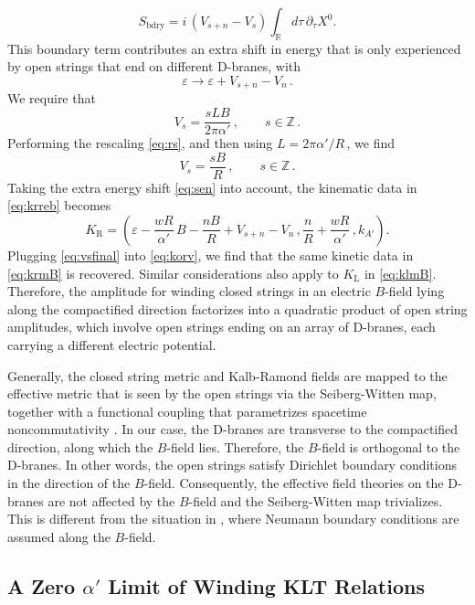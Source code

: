 \documentclass[11pt]{article}
\newcommand{\be}{\begin{equation}}
\newcommand{\ee}{\end{equation}}
\newcommand{\lr}{\left (}
\newcommand{\rr}{\right )}
\newcommand{\p}{\partial}
\begin{document}
%
\be
    S_\text{bdry} = i \, (V_{s+n} - V_s) \int_{\mathbb{R}} d\tau \, \p_\tau X^0.
\ee
%
This boundary term contributes an extra shift in energy that is only experienced by open strings that end on different D-branes, with
%
\be \label{eq:sen}
    \varepsilon \rightarrow \varepsilon + V_{s+n} - V_n\,.
\ee
%
We require that
%
\be \label{eq:Vs}
    V_s = \frac{s L B}{2\pi\alpha'}\,,
        \qquad
    s \in \mathbb{Z}\,.
\ee
%
Performing the rescaling \eqref{eq:rs}, and then using $L = 2 \pi \alpha' / R$\,, we find
%
\be \label{eq:vsfinal}
    V_s = \frac{s B}{R}\,,
        \qquad%
    s \in \mathbb{Z}\,.
\ee
%
Taking the extra energy shift \eqref{eq:sen} into account, the kinematic data in \eqref{eq:krreb} becomes
%
\be \label{eq:korv}
    K_\text{R} = \lr \varepsilon - \frac{w R}{\alpha'} \, B -  \frac{n B}{R} + V_{s+n} - V_n\,, \frac{n}{R} + \frac{w R}{\alpha'}\,, k_{A'} \rr.
\ee
%
Plugging \eqref{eq:vsfinal} into \eqref{eq:korv}, we find that the same kinetic data in \eqref{eq:krmB} is recovered. Similar considerations also apply to $K_{\text{L}}$ in \eqref{eq:klmB}. 
%
Therefore, the amplitude for winding closed strings in an electric $B$-field lying along the compactified direction factorizes into a quadratic product of open string amplitudes, which involve open strings ending on an array of D-branes, each carrying a different electric potential.

Generally, the closed string metric and Kalb-Ramond fields are mapped to the effective metric that is seen by the open strings via the Seiberg-Witten map, together with a functional coupling that parametrizes spacetime noncommutativity \cite{Seiberg:1999vs}. In our case, the D-branes are transverse to the compactified direction, along which the $B$-field lies. Therefore, the $B$-field is orthogonal to the D-branes. In other words, the open strings satisfy Dirichlet boundary conditions in the direction of the $B$-field. Consequently, the effective field theories on the D-branes are not affected by the $B$-field and the Seiberg-Witten map trivializes. This is different from the situation in \cite{Seiberg:1999vs}, where Neumann boundary conditions are assumed along the $B$-field.   





\subsection{A Zero \texorpdfstring{$\alpha'$}{alphap} Limit of Winding KLT Relations} \label{sec:zalwkltr}
\end{document}
